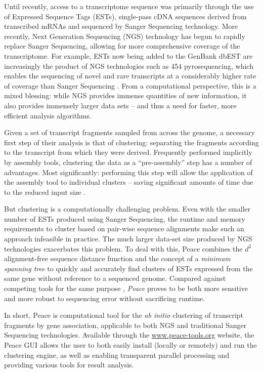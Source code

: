 \documentclass[a4,center,fleqn]{NAR}
\begin{document}
Until recently, access to a transcriptome sequence was primarily
through the use of Expressed Sequence Tags (ESTs), single-pass cDNA
sequences derived from transcribed mRNAs and sequenced by Sanger
Sequencing technology.  More recently, Next Generation Sequencing
(NGS) technology has begun to rapidly replace Sanger Sequencing,
allowing for more comprehensive coverage of the transcriptome.  For
example, ESTs now being added to the GenBank dbEST are increasingly
the product of NGS technologies such as 454 pyrosequencing, which
enables the sequencing of novel and rare transcripts at a considerably
higher rate of coverage than Sanger Sequencing
\cite{Cheung2006,Emrich2007}.  From a computational perspective, this
is a mixed blessing: while NGS provides immense quantities of new
information, it also provides immensely larger data sets -- and thus a
need for faster, more efficient analysis algorithms.

Given a set of transcript fragments sampled from across the genome, a
necessary first step of their analysis is that of clustering: separating
the fragments according to the transcript from which they were
derived.  Frequently performed implicitly by assembly tools,
clustering the data as a ``pre-assembly'' step has a number of
advantages.  Most significantly: performing this step will
allow the application of the assembly tool to individual clusters --
saving significant amounts of time due to the reduced input size
\cite{Hazelhurst08a}.  

But clustering is a computationally challenging problem.  Even with
the smaller number of ESTs produced using Sanger Sequencing, the
runtime and memory requirements to cluster based on pair-wise sequence
alignments make such an approach infeasible in practice.  The much
larger data-set size produced by NGS technologies exacerbates this
problem.  To deal with this, {\sc Peace} combines the $d^2$
alignment-free sequence distance function \cite{Hide94} and the
concept of a {\it minimum spanning tree} \cite{Prim57} to quickly and
accurately find clusters of ESTs expressed from the same gene without
reference to a sequenced genome.  Compared against competing tools
for the same purpose \cite{Burke99,Slater00,Huang99,Parkinson02,Kalyanaraman03,Malde03,
  Ptitsyn05,Hazelhurst08a,Picardi09}, {\it Peace} proves to be both more sensitive and
more robust to sequencing error without sacrificing runtime.


In short, {\sc Peace} is computational tool for the {\it ab initio}
clustering of transcript fragments by gene association, applicable to both NGS and
traditional Sanger Sequencing technologies.  Available through the
\href{http://www.peace-tools.org}{www.peace-tools.org} website, the
{\sc Peace} GUI allows the user to both easily install (locally or
remotely) and run the clustering engine, as well as enabling
transparent parallel processing and providing various tools for result
analysis.  
\end{document}
